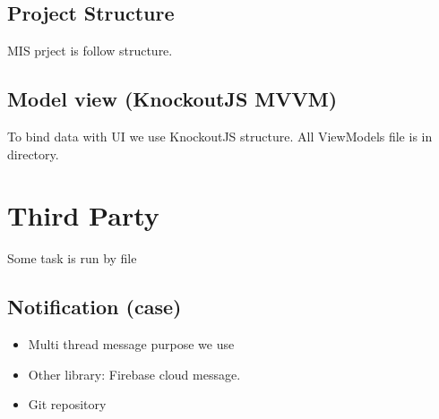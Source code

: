\documentclass[letterpaper,10pt,english,openany,oneside]{sphinxmanual}
\begin{document}
\section{Project Structure}
\label{\detokenize{technology/technology:project-structure}}
\sphinxAtStartPar
MIS prject is follow  structure.


\section{Model view (KnockoutJS \sphinxhyphen{} MVVM)}
\label{\detokenize{technology/technology:model-view-knockoutjs-mvvm}}
\sphinxAtStartPar
To bind data with UI we use KnockoutJS  structure. All ViewModels file is in  directory.


\chapter{Third Party}
\label{\detokenize{Third Party/data-export-tool:third-party}}\label{\detokenize{Third Party/data-export-tool::doc}}
\sphinxAtStartPar
Some task is run by  file


\section{Notification (case)}
\label{\detokenize{Third Party/data-export-tool:notification-case}}\begin{itemize}
\item {} 
\sphinxAtStartPar
Multi thread message purpose we use 

\item {} 
\sphinxAtStartPar
Other library: Firebase cloud message.

\item {} 
\sphinxAtStartPar
Git repository 

\end{itemize}
\end{document}
